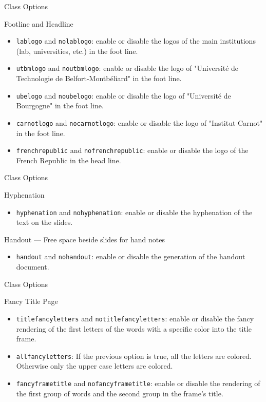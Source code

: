 \documentclass[english,sectioncirclenumberstyle]{ciadbeamer}
\begin{document}
\begin{frame}[t]{Class Options \insertcontinuationtext}
	\begin{block}{Footline and Headline}
		\begin{itemize}
		\item \texttt{lablogo} and \texttt{nolablogo}: enable or disable the logos of the main institutions (lab, universities, etc.) in the foot line.
		\item \texttt{utbmlogo} and \texttt{noutbmlogo}: enable or disable the logo of "Universit\'e de Technologie de Belfort-Montb\'eliard" in the foot line.
		\item \texttt{ubelogo} and \texttt{noubelogo}: enable or disable the logo of "Universit\'e de Bourgogne" in the foot line.
		\item \texttt{carnotlogo} and \texttt{nocarnotlogo}: enable or disable the logo of "Institut Carnot" in the foot line.
		\item \texttt{frenchrepublic} and \texttt{nofrenchrepublic}: enable or disable the logo of the French Republic in the head line.
		\end{itemize}
	\end{block}
\end{frame}

\begin{frame}[t]{Class Options \insertcontinuationtext}
	\begin{block}{Hyphenation}
		\begin{itemize}
		\item \texttt{hyphenation} and \texttt{nohyphenation}: enable or disable the hyphenation of the text on the slides.
		\end{itemize}
	\end{block}
	\begin{block}{Handout --- Free space beside slides for hand notes}
		\begin{itemize}
		\item \texttt{handout} and \texttt{nohandout}: enable or disable the generation of the handout document.
		\end{itemize}
	\end{block}
\end{frame}

\begin{frame}[t]{Class Options \insertcontinuationtext}
	\begin{block}{Fancy Title Page}
		\begin{itemize}
		\item \texttt{titlefancyletters} and \texttt{notitlefancyletters}: enable or disable the fancy rendering of the first letters of the words with a specific color into the title frame.
		\item \texttt{allfancyletters}: If the previous option is true, all the letters are colored. Otherwise only the upper case letters are colored.
		\item \texttt{fancyframetitle} and \texttt{nofancyframetitle}: enable or disable the rendering of the first group of words and the second group in the frame's title.
		\end{itemize}
	\end{block}
\end{frame}
\end{document}
